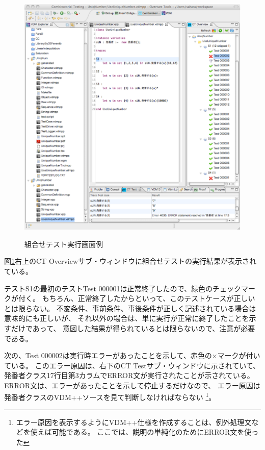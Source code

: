 \begin{figure}[h]
	\centering
	{\includegraphics[width=55zw, keepaspectratio]{./UniqNumber/image/CombinatorialTestScreen.pdf}}
	\caption{組合せテスト実行画面例}
	\label{fig:CombinatorialTestScreen}
\end{figure}

図\ref{fig:CombinatorialTestScreen}右上のCT Overviewサブ・ウィンドウに組合せテストの実行結果が表示されている。

テストS1の最初のテストTest 000001は正常終了したので、緑色のチェックマークが付く。
もちろん、正常終了したからといって、このテストケースが正しいとは限らない。
不変条件、事前条件、事後条件が正しく記述されている場合は意味的にも正しいが、
それ以外の場合は、単に実行が正常に終了したことを示すだけであって、
意図した結果が得られているとは限らないので、注意が必要である。

次の、Test 000002は実行時エラーがあったことを示して、赤色の×マークが付いている。
このエラー原因は、右下のCT Testサブ・ウィンドウに示されていて、
発番者クラス17行目第3カラムでERROR文が実行されたことが示されている。
ERROR文は、エラーがあったことを示して停止するだけなので、
エラー原因は発番者クラスのVDM++ソースを見て判断しなければならない
\footnote{エラー原因を表示するようにVDM++仕様を作成することは、例外処理文などを使えば可能である。
ここでは、説明の単純化のためにERROR文を使った}。

